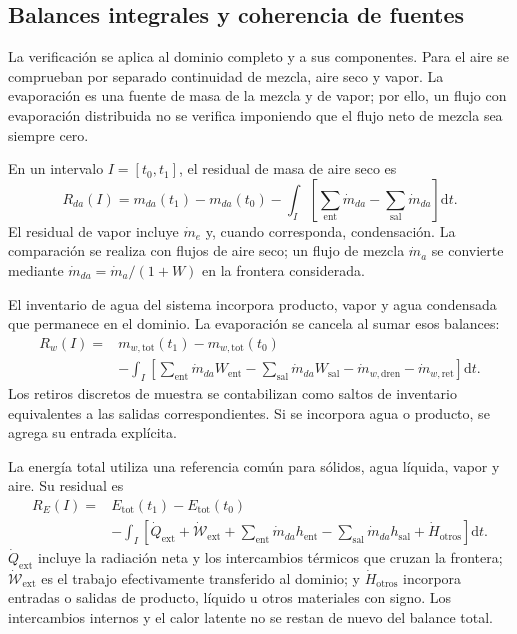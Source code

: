 \subsection{Balances integrales y coherencia de fuentes}
\label{met:conservacion}

La verificación se aplica al dominio completo y a sus componentes. Para el aire se comprueban por separado continuidad de mezcla, aire seco y vapor. La evaporación es una fuente de masa de la mezcla y de vapor; por ello, un flujo con evaporación distribuida no se verifica imponiendo que el flujo neto de mezcla sea siempre cero.

En un intervalo $I=[t_0,t_1]$, el residual de masa de aire seco es
\begin{equation}
R_{da}(I)=m_{da}(t_1)-m_{da}(t_0)
-\int_I\left[
\sum_{\mathrm{ent}}\dot m_{da}
-\sum_{\mathrm{sal}}\dot m_{da}
\right]\mathrm dt.
\label{met:residual_aire_seco}
\end{equation}
El residual de vapor incluye $\dot m_e$ y, cuando corresponda, condensación. La comparación se realiza con flujos de aire seco; un flujo de mezcla $\dot m_a$ se convierte mediante $\dot m_{da}=\dot m_a/(1+W)$ en la frontera considerada.

El inventario de agua del sistema incorpora producto, vapor y agua condensada que permanece en el dominio. La evaporación se cancela al sumar esos balances:
\begin{equation}
\begin{split}
R_w(I)={}&m_{w,\mathrm{tot}}(t_1)-m_{w,\mathrm{tot}}(t_0)\\
&-\int_I\left[
\sum_{\mathrm{ent}}\dot m_{da}W_{\mathrm{ent}}
-\sum_{\mathrm{sal}}\dot m_{da}W_{\mathrm{sal}}
-\dot m_{w,\mathrm{dren}}
-\dot m_{w,\mathrm{ret}}
\right]\mathrm dt.
\end{split}
\label{met:residual_agua}
\end{equation}
Los retiros discretos de muestra se contabilizan como saltos de inventario equivalentes a las salidas correspondientes. Si se incorpora agua o producto, se agrega su entrada explícita.

La energía total utiliza una referencia común para sólidos, agua líquida, vapor y aire. Su residual es
\begin{equation}
\begin{split}
R_E(I)={}&E_{\mathrm{tot}}(t_1)-E_{\mathrm{tot}}(t_0)\\
&-\int_I\left[
\dot Q_{\mathrm{ext}}+\dot{\mathcal W}_{\mathrm{ext}}
+\sum_{\mathrm{ent}}\dot m_{da}h_{\mathrm{ent}}
-\sum_{\mathrm{sal}}\dot m_{da}h_{\mathrm{sal}}
+\dot H_{\mathrm{otros}}
\right]\mathrm dt.
\end{split}
\label{met:residual_energia}
\end{equation}
$\dot Q_{\mathrm{ext}}$ incluye la radiación neta y los intercambios térmicos que cruzan la frontera; $\dot{\mathcal W}_{\mathrm{ext}}$ es el trabajo efectivamente transferido al dominio; y $\dot H_{\mathrm{otros}}$ incorpora entradas o salidas de producto, líquido u otros materiales con signo. Los intercambios internos y el calor latente no se restan de nuevo del balance total.

